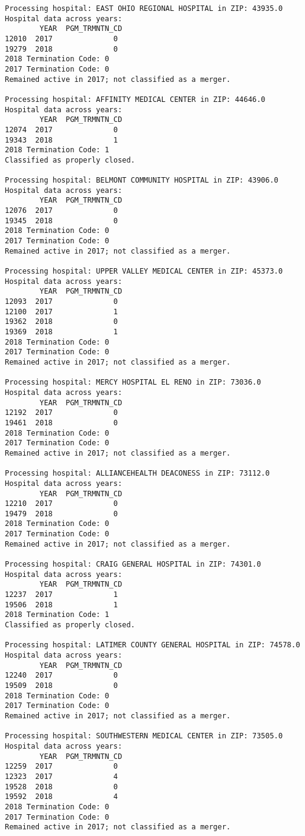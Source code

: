 \documentclass[
  letterpaper,
  DIV=11,
  numbers=noendperiod]{scrartcl}
\begin{document}
\begin{verbatim}
Processing hospital: EAST OHIO REGIONAL HOSPITAL in ZIP: 43935.0
Hospital data across years:
        YEAR  PGM_TRMNTN_CD
12010  2017              0
19279  2018              0
2018 Termination Code: 0
2017 Termination Code: 0
Remained active in 2017; not classified as a merger.

Processing hospital: AFFINITY MEDICAL CENTER in ZIP: 44646.0
Hospital data across years:
        YEAR  PGM_TRMNTN_CD
12074  2017              0
19343  2018              1
2018 Termination Code: 1
Classified as properly closed.

Processing hospital: BELMONT COMMUNITY HOSPITAL in ZIP: 43906.0
Hospital data across years:
        YEAR  PGM_TRMNTN_CD
12076  2017              0
19345  2018              0
2018 Termination Code: 0
2017 Termination Code: 0
Remained active in 2017; not classified as a merger.

Processing hospital: UPPER VALLEY MEDICAL CENTER in ZIP: 45373.0
Hospital data across years:
        YEAR  PGM_TRMNTN_CD
12093  2017              0
12100  2017              1
19362  2018              0
19369  2018              1
2018 Termination Code: 0
2017 Termination Code: 0
Remained active in 2017; not classified as a merger.

Processing hospital: MERCY HOSPITAL EL RENO in ZIP: 73036.0
Hospital data across years:
        YEAR  PGM_TRMNTN_CD
12192  2017              0
19461  2018              0
2018 Termination Code: 0
2017 Termination Code: 0
Remained active in 2017; not classified as a merger.

Processing hospital: ALLIANCEHEALTH DEACONESS in ZIP: 73112.0
Hospital data across years:
        YEAR  PGM_TRMNTN_CD
12210  2017              0
19479  2018              0
2018 Termination Code: 0
2017 Termination Code: 0
Remained active in 2017; not classified as a merger.

Processing hospital: CRAIG GENERAL HOSPITAL in ZIP: 74301.0
Hospital data across years:
        YEAR  PGM_TRMNTN_CD
12237  2017              1
19506  2018              1
2018 Termination Code: 1
Classified as properly closed.

Processing hospital: LATIMER COUNTY GENERAL HOSPITAL in ZIP: 74578.0
Hospital data across years:
        YEAR  PGM_TRMNTN_CD
12240  2017              0
19509  2018              0
2018 Termination Code: 0
2017 Termination Code: 0
Remained active in 2017; not classified as a merger.

Processing hospital: SOUTHWESTERN MEDICAL CENTER in ZIP: 73505.0
Hospital data across years:
        YEAR  PGM_TRMNTN_CD
12259  2017              0
12323  2017              4
19528  2018              0
19592  2018              4
2018 Termination Code: 0
2017 Termination Code: 0
Remained active in 2017; not classified as a merger.


\end{verbatim}
\end{document}
